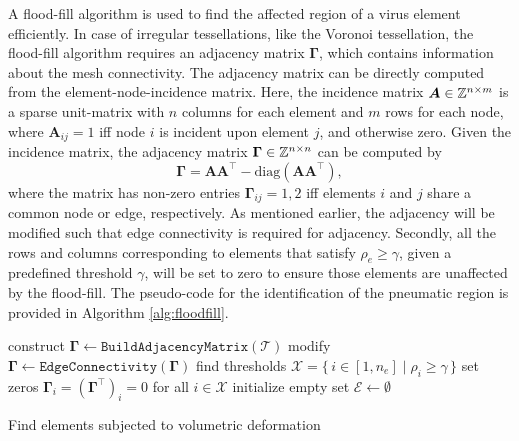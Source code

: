 A flood-fill algorithm is used \cite{Chartrand1977Jan} to find the affected region of a virus element efficiently. In case of irregular tessellations, like the Voronoi tessellation, the flood-fill algorithm requires an adjacency matrix $\boldsymbol{\Gamma}$, which contains information about the mesh connectivity. The adjacency matrix can be directly computed from the element-node-incidence matrix. Here, the incidence matrix $\boldsymbol{A} \in \mathbb{Z}^{n\times m}$ is a sparse unit-matrix with $n$ columns for each element and $m$ rows for each node, where $\boldsymbol{A}_{ij} = 1$ iff node $i$ is incident upon element $j$, and otherwise zero. Given the incidence matrix, the adjacency matrix $\boldsymbol{\Gamma}\in \mathbb{Z}^{n\times n}$ can be computed by
%
\begin{equation}
\boldsymbol{\Gamma} = \boldsymbol{A}\boldsymbol{A}^\top - \text{diag}(\boldsymbol{A}\boldsymbol{A}^\top), \label{eq:adjecency}
\end{equation}
%
where the matrix has non-zero entries $\boldsymbol{\Gamma}_{ij} = 1,2$ iff elements $i$ and $j$ share a common node or edge, respectively. As mentioned earlier, the adjacency will be modified such that edge connectivity is required for adjacency. Secondly, all the rows and columns corresponding to elements that satisfy $\rho_e \ge \gamma$, given a predefined threshold $\gamma$, will be set to zero to ensure those elements are unaffected by the flood-fill. The pseudo-code for the identification of the pneumatic region is provided in Algorithm \ref{alg:floodfill}.

\begin{algorithm}[!t]
    construct $\boldsymbol{\Gamma}  \gets {\texttt{BuildAdjacencyMatrix}}(\mathcal{T})$\;
    modify $\boldsymbol{\Gamma}  \gets {\texttt{EdgeConnectivity}}(\boldsymbol{\Gamma})$\;
    find thresholds $\mathcal{X} = \{\, i \in [1,n_e] \;|\; \rho_i \ge \gamma \,\}$\;
    set zeros $\boldsymbol{\Gamma}_i = (\boldsymbol{\Gamma}^\top)_i = 0$ for all $i \in  \mathcal{X}$\;
    initialize empty set $\mathcal{E} \gets \emptyset$\;
    \caption{Find elements subjected to volumetric deformation \label{alg:floodfill}}
\end{algorithm}

